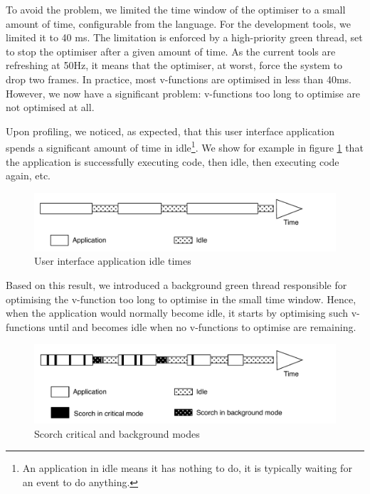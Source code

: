 \documentclass[a4paper,12pt,twoside]{../includes/ThesisStyle}
\begin{document}
To avoid the problem, we limited the time window of the optimiser to a small amount of time, configurable from the language. For the development tools, we limited it to 40 ms. The limitation is enforced by a high-priority green thread, set to stop the optimiser after a given amount of time. As the current tools are refreshing at 50Hz, it means that the optimiser, at worst, force the system to drop two frames. In practice, most v-functions are optimised in less than 40ms. However, we now have a significant problem: v-functions too long to optimise are not optimised at all.

Upon profiling, we noticed, as expected, that this user interface application spends a significant amount of time in idle\footnote{An application in idle means it has nothing to do, it is typically waiting for an event to do anything.}. We show for example in figure \ref{fig:ApplicationIdle} that the application is successfully executing code, then idle, then executing code again, etc. 

\begin{figure}[h!]
    \begin{center}
        \includegraphics[width=0.9\linewidth]{ApplicationIdle}
        \caption{User interface application idle times}
        \label{fig:ApplicationIdle}
    \end{center}
\end{figure}

Based on this result, we introduced a background green thread responsible for optimising the v-function too long to optimise in the small time window. Hence, when the application would normally become idle, it starts by optimising such v-functions until and becomes idle when no v-functions to optimise are remaining.

\begin{figure}[h!]
    \begin{center}
        \includegraphics[width=0.9\linewidth]{ScorchModes}
        \caption{Scorch critical and background modes}
        \label{fig:ScorchModes}
    \end{center}
\end{figure}
\end{document}
